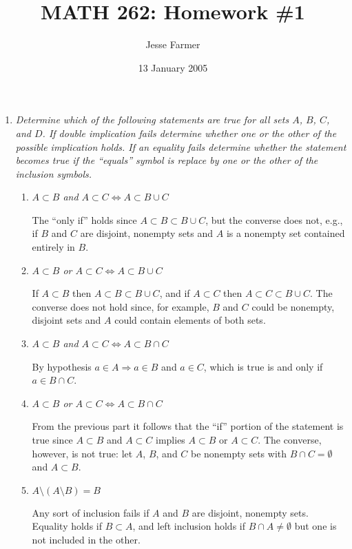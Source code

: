 \documentclass[letterpaper, 11pt]{article}
\title{MATH 262: Homework \#1}
\author{Jesse Farmer}
\date{13 January 2005}
\begin{document}
\maketitle
\begin{enumerate}
\item \emph{Determine which of the following statements are true for all sets $A$, $B$, $C$, and $D$.  If double implication fails determine whether one or the other of the possible implication holds.  If an equality fails determine whether the statement becomes true if the ``equals'' symbol is replace by one or the other of the inclusion symbols.}
\begin{enumerate}
\item \emph{$A \subset B$ and $A \subset C \Leftrightarrow A \subset B \cup C$}

The ``only if'' holds since $A \subset B \subset B \cup C$, but the converse does not, e.g., if $B$ and $C$ are disjoint, nonempty sets and $A$ is a nonempty set contained entirely in $B$.

\item \emph{$A \subset B$ or $A \subset C \Leftrightarrow A \subset B \cup C$}

If $A \subset B$ then $A \subset B \subset B \cup C$, and if $A \subset C$ then $A \subset C \subset B \cup C$.  The converse does not hold since, for example, $B$ and $C$ could be nonempty, disjoint sets and $A$ could contain elements of both sets.

\item \emph{$A \subset B$ and $A \subset C \Leftrightarrow A \subset B \cap C$}

By hypothesis $a \in A \Rightarrow a \in B$ and $a \in C$, which is true is and only if $a \in B \cap C$.

\item \emph{$A \subset B$ or $A \subset C \Leftrightarrow A \subset B \cap C$}

From the previous part it follows that the ``if'' portion of the statement is true since $A \subset B$ and $A \subset C$ implies $A \subset B$ or $A \subset C$.  The converse, however, is not true: let $A$, $B$, and $C$ be nonempty sets with $B \cap C = \emptyset$ and $A \subset B$.

\item \emph{$A \setminus (A \setminus B) = B$}

Any sort of inclusion fails if $A$ and $B$ are disjoint, nonempty sets.  Equality holds if $B \subset A$, and left inclusion holds if $B \cap A \neq \emptyset$ but one is not included in the other.


\end{enumerate}
\end{enumerate}
\end{document}
